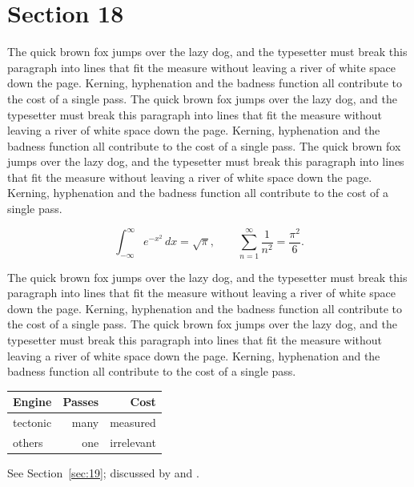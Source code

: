 \documentclass{article}
\begin{document}
\section{Section 18}
\label{sec:18}
The quick brown fox jumps over the lazy dog, and the typesetter must break this paragraph into lines that fit the measure without leaving a river of white space down the page. Kerning, hyphenation and the badness function all contribute to the cost of a single pass. The quick brown fox jumps over the lazy dog, and the typesetter must break this paragraph into lines that fit the measure without leaving a river of white space down the page. Kerning, hyphenation and the badness function all contribute to the cost of a single pass. The quick brown fox jumps over the lazy dog, and the typesetter must break this paragraph into lines that fit the measure without leaving a river of white space down the page. Kerning, hyphenation and the badness function all contribute to the cost of a single pass. 

\begin{equation}\label{eq:18}
\int_{-\infty}^{\infty} e^{-x^{2}}\,dx = \sqrt{\pi}, \qquad
\sum_{n=1}^{\infty} \frac{1}{n^{2}} = \frac{\pi^{2}}{6}.
\end{equation}

The quick brown fox jumps over the lazy dog, and the typesetter must break this paragraph into lines that fit the measure without leaving a river of white space down the page. Kerning, hyphenation and the badness function all contribute to the cost of a single pass. The quick brown fox jumps over the lazy dog, and the typesetter must break this paragraph into lines that fit the measure without leaving a river of white space down the page. Kerning, hyphenation and the badness function all contribute to the cost of a single pass. 

\begin{center}
\begin{tabular}{lrr}
\toprule
Engine & Passes & Cost \\
\midrule
tectonic & many & measured \\
others & one & irrelevant \\
\bottomrule
\end{tabular}
\end{center}

See Section~\ref{sec:19}; discussed by \textcite{k4} and \textcite{l1}.
\end{document}

